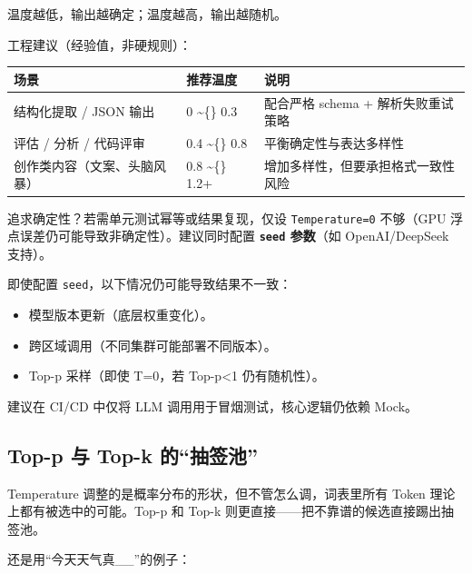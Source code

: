 \documentclass[10pt,a4paper]{ctexart}
\begin{document}
温度越低，输出越确定；温度越高，输出越随机。



工程建议（经验值，非硬规则）：


{\footnotesize
\begin{tabularx}{\textwidth}{|X|X|X|}
\hline
\textbf{场景} & \textbf{推荐温度} & \textbf{说明} \\
\hline
结构化提取 / JSON 输出 & 0 \textasciitilde\{\} 0.3 & 配合严格 schema + 解析失败重试策略 \\
\hline
评估 / 分析 / 代码评审 & 0.4 \textasciitilde\{\} 0.8 & 平衡确定性与表达多样性 \\
\hline
创作类内容（文案、头脑风暴） & 0.8 \textasciitilde\{\} 1.2+ & 增加多样性，但要承担格式一致性风险 \\
\hline
\end{tabularx}
}



追求确定性？若需单元测试幂等或结果复现，仅设 \texttt{Temperature=0} 不够（GPU 浮点误差仍可能导致非确定性）。建议同时配置 \textbf{\texttt{seed} 参数}（如 OpenAI/DeepSeek 支持）。



即使配置 \texttt{seed}，以下情况仍可能导致结果不一致：


\begin{itemize}[itemsep=2pt, topsep=4pt]
  \item 模型版本更新（底层权重变化）。
  \item 跨区域调用（不同集群可能部署不同版本）。
  \item Top-p 采样（即使 T=0，若 Top-p<1 仍有随机性）。
\end{itemize}


建议在 CI/CD 中仅将 LLM 调用用于冒烟测试，核心逻辑仍依赖 Mock。



\subsection{Top-p 与 Top-k 的“抽签池”}


Temperature 调整的是概率分布的形状，但不管怎么调，词表里所有 Token 理论上都有被选中的可能。Top-p 和 Top-k 则更直接——把不靠谱的候选直接踢出抽签池。



还是用“今天天气真\_\_”的例子：
\end{document}
